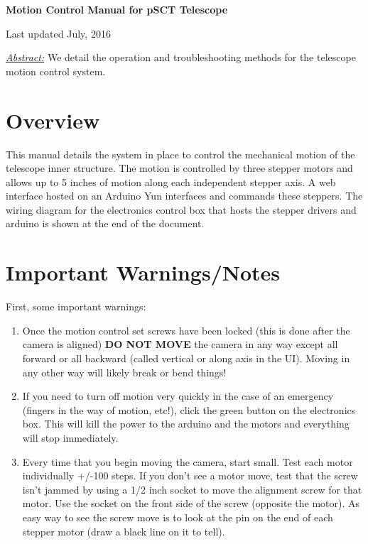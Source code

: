 \documentclass[11pt]{article}
\begin{document}
\begin{center}
{\bf{\huge{Motion Control Manual for pSCT Telescope}}}

\vspace{0.1in}
Last updated July, 2016

\vspace{0.3in}
{\it{\underline{Abstract:}}} We detail the operation and troubleshooting methods for the telescope motion control system.

\end{center}

\tableofcontents

\vspace{0.2in}


\section{Overview}

This manual details the system in place to control the mechanical motion of the telescope inner structure.
The motion is controlled by three stepper motors and allows up to 5 inches of motion along each independent stepper axis. 
A web interface hosted on an Arduino Yun interfaces and commands these steppers.
The wiring diagram for the electronics control box that hosts the stepper drivers and arduino is shown at the end of the document.


\section{Important Warnings/Notes}

First, some important warnings:
\begin{enumerate}
	\item Once the motion control set screws have been locked (this is done after the camera is aligned) {\bf DO NOT MOVE} the camera in any way except all forward or all backward (called vertical or along axis in the UI).
	Moving in any other way will likely break or bend things!
	\item If you need to turn off motion very quickly in the case of an emergency (fingers in the way of motion, etc!), click the green button on the electronics box.
		 This will kill the power to the arduino and the motors and everything will stop immediately.
	\item Every time that you begin moving the camera, start small.  Test each motor individually +/-100 steps.  
		If you don't see a motor move, test that the screw isn't jammed by using a 1/2 inch socket to move the alignment screw for that motor.
		Use the socket on the front side of the screw (opposite the motor).
		As easy way to see the screw move is to look at the pin on the end of each stepper motor (draw a black line on it to tell).
\end{enumerate}
\end{document}
